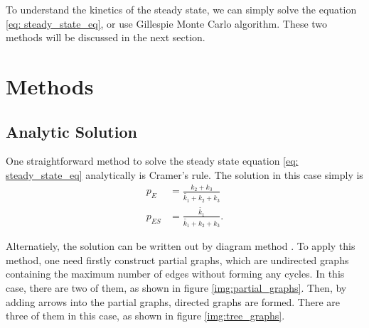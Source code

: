	To understand the kinetics of the steady state, we can simply solve the equation \eqref{eq: steady_state_eq}, or use Gillespie Monte Carlo algorithm. These two methods will be discussed in the next section.

\section{Methods}
	\subsection{Analytic Solution}
		One straightforward method to solve the steady state equation \eqref{eq: steady_state_eq} analytically is Cramer's rule. The solution in this case simply is 
		\begin{equation}
			\begin{aligned}
				p_E &= \frac{k_2+k_3}{\widetilde{k_1}+k_2+k_3}\\
				p_{ES} &= \frac{\widetilde{k_1}}{\widetilde{k_1}+k_2+k_3}.
			\end{aligned}
			\label{eq:state_prob}
		\end{equation}

		Alternatiely, the solution can be written out by diagram method \cite{hill2004}. To apply this method, one need firstly construct partial graphs, which are undirected graphs containing the maximum number of edges without forming any cycles. In this case, there are two of them, as shown in figure \ref{img:partial_graphs}. Then, by adding arrows into the partial graphs, directed graphs are formed. There are three of them in this case, as shown in figure \ref{img:tree_graphs}.

